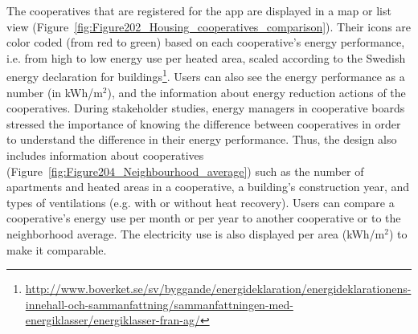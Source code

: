 The cooperatives that are registered for the app are displayed in a map or list view (Figure~\ref{fig:Figure202_Housing_cooperatives_comparison}). Their icons are color coded (from red to green) based on each cooperative's energy performance, i.e. from high to low energy use per heated area, scaled according to the Swedish energy declaration for buildings\footnote{\url{http://www.boverket.se/sv/byggande/energideklaration/energideklarationens-innehall-och-sammanfattning/sammanfattningen-med-energiklasser/energiklasser-fran-ag/}}. 
% 
Users can also see the energy performance as a number (in kWh/m$^2$), and the information about energy reduction actions of the cooperatives. %
% 
During stakeholder studies, energy managers in cooperative boards stressed the importance of knowing the difference between cooperatives in order to understand the difference in their energy performance. Thus, the design also includes information about cooperatives (Figure~\ref{fig:Figure204_Neighbourhood_average}) such as the number of apartments and heated areas in a cooperative, a building's construction year, and types of ventilations (e.g. with or without heat recovery).
% 
Users can compare a cooperative's energy use per month or per year to another cooperative or to the neighborhood average. The electricity use is also displayed per area (kWh/m$^2$) to make it comparable.
